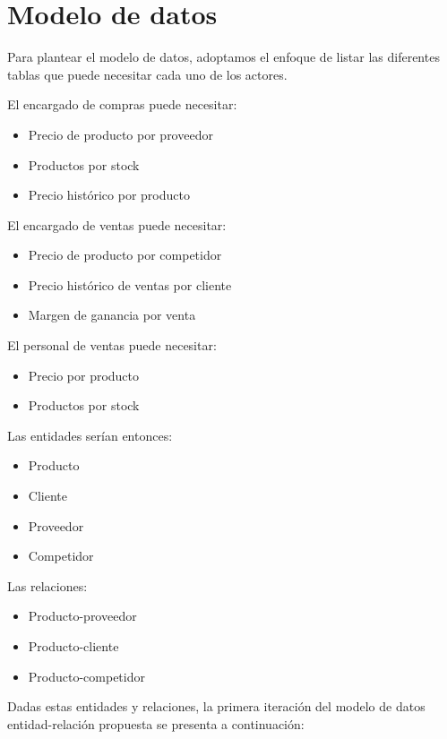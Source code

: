 
\section{Modelo de datos}

Para plantear el modelo de datos,
adoptamos el enfoque de listar las diferentes tablas que puede necesitar cada uno de los actores.

El encargado de compras puede necesitar:
\begin{itemize}
	\item Precio de producto por proveedor 
	\item Productos por stock 
	\item Precio histórico por producto
\end{itemize}

El encargado de ventas puede necesitar:
\begin{itemize}
	\item Precio de producto por competidor
	\item Precio histórico de ventas por cliente
	\item Margen de ganancia por venta
\end{itemize}

El personal de ventas puede necesitar:
\begin{itemize}
	\item Precio por producto
	\item Productos por stock 
\end{itemize}

Las entidades serían entonces:
\begin{itemize}
	\item Producto
	\item Cliente 
	\item Proveedor 
	\item Competidor 
\end{itemize}

Las relaciones:
\begin{itemize}
	\item Producto-proveedor 
	\item Producto-cliente 
	\item Producto-competidor 
\end{itemize}

Dadas estas entidades y relaciones,
la primera iteración del modelo de datos entidad-relación propuesta se presenta a continuación:

